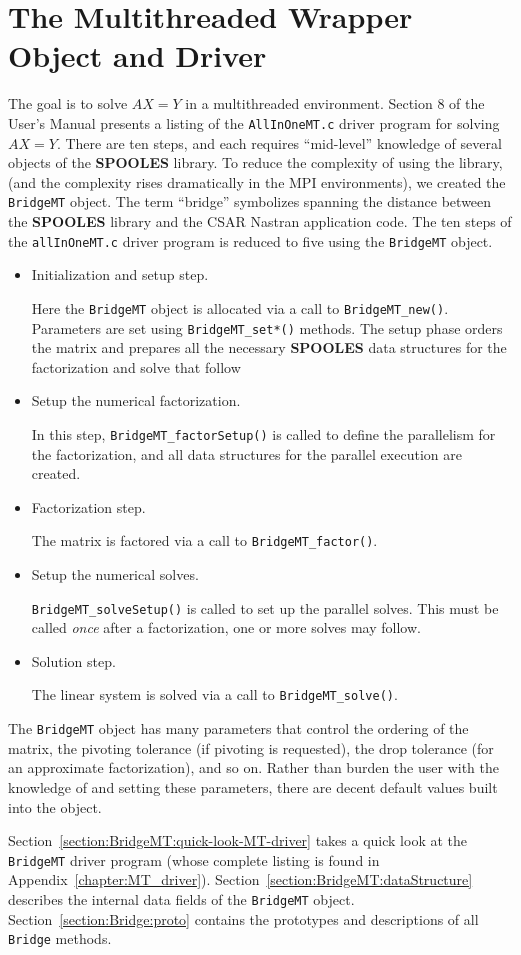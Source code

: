 \chapter{The Multithreaded Wrapper Object and Driver}
\label{section:MT}
The goal is to solve $AX = Y$ in a multithreaded environment.
Section 8 of the User's Manual presents a listing of the 
{\tt AllInOneMT.c} driver program for solving $AX =Y$.
There are ten steps, and each requires ``mid-level'' knowledge 
of several objects of the {\bf SPOOLES} library.
To reduce the complexity of using the library, 
(and the complexity rises dramatically in the MPI environments),
we created the {\tt BridgeMT} object.
The term ``bridge'' symbolizes spanning the distance between the
{\bf SPOOLES} library and the CSAR Nastran application code.
The ten steps of the {\tt allInOneMT.c} driver program is reduced to
five using the {\tt BridgeMT} object.
\begin{itemize}
\item Initialization and setup step.
\par
Here the {\tt BridgeMT} object is allocated via a call to 
{\tt BridgeMT\_new()}.
Parameters are set using {\tt BridgeMT\_set*()} methods.
The setup phase orders the matrix and prepares all the necessary 
{\bf SPOOLES} data structures for the factorization and solve 
that follow
\item Setup the numerical factorization.
\par
In this step, 
{\tt BridgeMT\_factorSetup()} is called
to define the parallelism for the factorization,
and all data structures for the parallel execution are created.
\item Factorization step.
\par
The matrix is factored via a call to {\tt BridgeMT\_factor()}.
\item Setup the numerical solves.
\par
{\tt BridgeMT\_solveSetup()} is called to set up the parallel solves.
This must be called {\it once} after a factorization,
one or more solves may follow.
\item Solution step.
\par
The linear system is solved via a call to {\tt BridgeMT\_solve()}.
\end{itemize}
\par
The {\tt BridgeMT} object has many parameters that control 
the ordering of the matrix,
the pivoting tolerance (if pivoting is requested),
the drop tolerance (for an approximate factorization),
and so on.
Rather than burden the user with the knowledge of and setting these
parameters, there are decent default values built into the object.
\par
Section~\ref{section:BridgeMT:quick-look-MT-driver} takes a quick
look at the {\tt BridgeMT} driver program (whose complete listing is
found in Appendix~\ref{chapter:MT_driver}).
Section~\ref{section:BridgeMT:dataStructure} describes the internal 
data fields of the {\tt BridgeMT} object.
Section~\ref{section:Bridge:proto} contains the prototypes and
descriptions of all {\tt Bridge} methods.
\par
